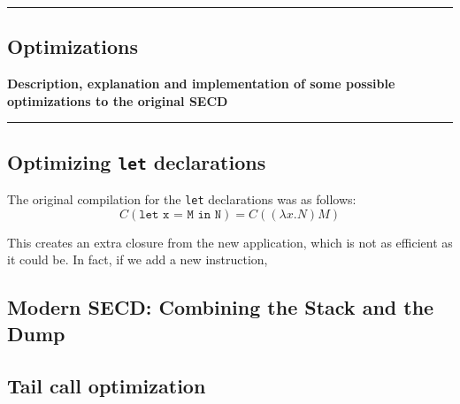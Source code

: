{\color{gray}\hrule}
\begin{center}
\section{Optimizations}
\textbf{Description, explanation and implementation of some possible optimizations to the original SECD}
\bigskip
\end{center}
{\color{gray}\hrule}
\subsection{Optimizing \texttt{let} declarations}
The original compilation for the \texttt{let} declarations was as follows:
\[ C(\texttt{let x = M in N}) = C((\lambda x.N)M) \]

This creates an extra closure from the new application, which is not as efficient as it could be.
In fact, if we add a new instruction, 
\subsection{Modern SECD: Combining the Stack and the Dump}
\subsection{Tail call optimization}


